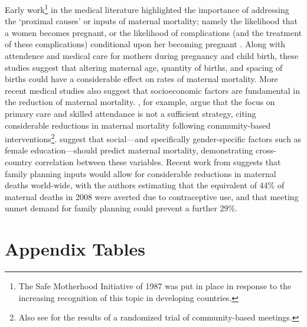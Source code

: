 \documentclass{article}[12pt,subeqn]
\newcommand{\MMRfolder}{"/home/damiancclarke/investigacion/Activa/MMR"}
\begin{document}
\begin{spacing}{1.4}
Early work\footnote{The Safe Motherhood Initiative of 1987 was put in place in 
response to the increasing recognition of this topic in developing countries.} 
in the medical literature highlighted the importance of addressing the `proximal 
causes' or inputs of maternal mortality; namely the likelihood that a women 
becomes pregnant, or the likelihood of complications (and the treatment of these 
complications) conditional upon her becoming pregnant \citep{MccarthyMaine1992, 
GoodburnCampbell2001, TrusselPebley1984}.  Along with attendence and medical 
care for mothers during pregnancy and child birth, these studies suggest that 
altering maternal age, quantity of births, and spacing of births could have a 
considerable effect on rates of maternal mortality.  More recent medical studies 
also  suggest that socioeconomic factors are fundamental in the reduction of 
maternal mortality.  \citet{Costelloetal2004}, for example, argue that the focus 
on primary care and skilled attendance is not a sufficient strategy, citing 
considerable reductions in maternal mortality following community-based 
interventions\footnote{Also see \citet{Manandharetal2004} for the results of a 
randomized trial of community-based meetings.}.  \citet{McAlisterBaskett2006} 
suggest that social---and specifically gender-specific factors such as female 
education---should predict maternal mortality, demonstrating cross-country 
correlation between these variables.  Recent work from \citet{Ahmedetal2012} 
suggests that family planning inputs would allow for considerable reductions in 
maternal deaths world-wide, with the authors estimating that the equivalent of 
44\% of maternal deaths in 2008 were averted due to contraceptive use, and that 
meeting unmet demand for family planning could prevent a further 29\%.


\newpage
\section{Appendix Tables}
\label{scn:appTables}

%

\end{spacing}
\end{document}
